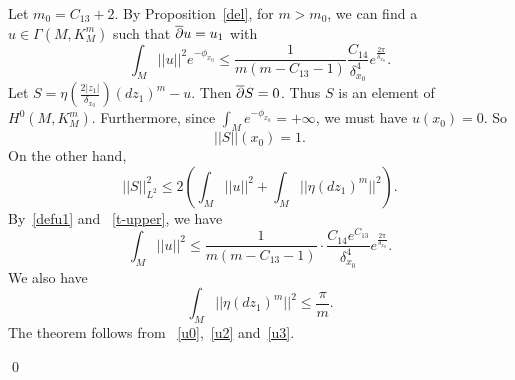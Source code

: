 Let $m_0=C_{13}+2$. 
By Proposition~\ref{del}, for $m>m_0$,  
 we can find a $u\in\Gamma(M,K_M^m)$ such that $\overline{\partial} u=u_1$ with
\begin{equation}\label{defu1}
\int_M||u||^2e^{-\phi_{x_0}}\leq
\frac{1}{m(m-C_{13}-1)}
\frac{C_{14}}{\delta^4_{x_0}}e^{\frac{2\pi}
{\delta_{x_0}}}.
\end{equation}
Let $S=\eta(\frac{2|z_1|}{\delta_{x_0}}) (dz_1)^m-u$. Then
$\overline{\partial} S=0$. Thus $S$ is an element of $H^0(M,K_M^m)$. Furthermore,
since $\int_M e^{-\phi_{x_0}}=+\infty$, we must have $u(x_0)=0$. So
\begin{equation}\label{u0}
||S||(x_0)=1.
\end{equation}
On the other hand,
\[
||S||^2_{L^2}\leq 2(\int_M||u||^2+\int_M||\eta (dz_1)^m||^2).
\]
By~\eqref{defu1} and ~\eqref{t-upper}, we have
\begin{equation}\label{u2}
\int_M||u||^2\leq
\frac{1}{m(m-C_{13}-1)}\cdot
\frac{C_{14} e^{C_{13}}}{\delta^4_{x_0}}
e^{\frac{2\pi}{\delta_{x_0}}}.
\end{equation}
We also have
\begin{equation}\label{u3}
\int_M||\eta (dz_1)^m||^2\leq\frac{\pi}{m}.
\end{equation}
The theorem follows from ~\eqref{u0},~\eqref{u2}
and~\eqref{u3}.

\qed
